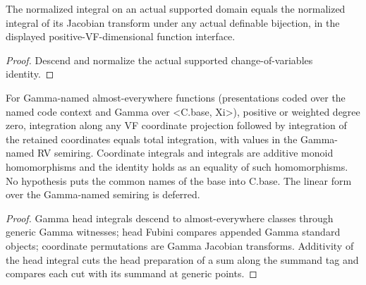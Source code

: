 \begin{theorem}

\label{s7-15}


\leanok

The normalized integral on an actual supported domain equals the normalized integral of its Jacobian transform under any actual definable bijection, in the displayed positive-VF-dimensional function interface.

\end{theorem}

\begin{proof}


\leanok

Descend and normalize the actual supported change-of-variables identity.

\end{proof}

\begin{proposition}

\label{s7-gn-11}


\leanok

For Gamma-named almost-everywhere functions (presentations coded over the named code context and Gamma over <C.base, Xi>), positive or weighted degree zero, integration along any VF coordinate projection followed by integration of the retained coordinates equals total integration, with values in the Gamma-named RV semiring. Coordinate integrals and integrals are additive monoid homomorphisms and the identity holds as an equality of such homomorphisms. No hypothesis puts the common names of the base into C.base. The linear form over the Gamma-named semiring is deferred.

\end{proposition}

\begin{proof}


\leanok

Gamma head integrals descend to almost-everywhere classes through generic Gamma witnesses; head Fubini compares appended Gamma standard objects; coordinate permutations are Gamma Jacobian transforms. Additivity of the head integral cuts the head preparation of a sum along the summand tag and compares each cut with its summand at generic points.

\end{proof}

